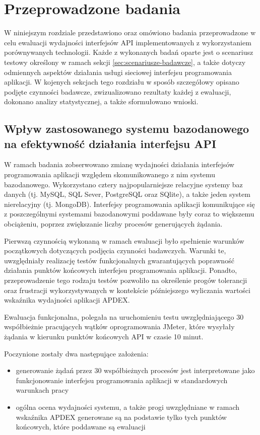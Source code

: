 \chapter{Przeprowadzone badania}
W niniejszym rozdziale przedstawiono oraz omówiono badania przeprowadzone w celu ewaluacji wydajności interfejsów API implementowanych z wykorzystaniem porównywanych technologii. Każde z wykonanych badań oparte jest o scenariusz testowy określony w ramach sekcji \ref{sec:scenariusze-badawcze}, a także dotyczy odmiennych aspektów działania usługi sieciowej interfejsu programowania aplikacji. W kojenych sekcjach tego rozdziału w sposób szczegółowy opisano podjęte czynności badawcze, zwizualizowano rezultaty każdej z ewaluacji, dokonano analizy statystycznej, a także sformułowano wnioski.

\section{Wpływ zastosowanego systemu bazodanowego na efektywność działania interfejsu API}
W ramach badania zobserwowano zmianę wydajności działania interfejsów programowania aplikacji względem skomunikowanego z nim systemu bazodanowego. Wykorzystano cztery najpopularniejsze relacyjne systemy baz danych (tj. MySQL, SQL Sever, PostgreSQL oraz SQlite), a także jeden system nierelacyjny (tj. MongoDB). Interfejsy programowania aplikacji komunikujące się z poszczególnymi systemami bazodanowymi poddawane były coraz to większemu obciążeniu, poprzez zwiększanie liczby procesów generujących żądania.

Pierwszą czynnością wykonaną w ramach ewaluacji było spełnienie warunków początkowych dotyczących podjęcia czynności badawczych. Warunki te, uwzględniały realizację testów funkcjonalnych gwarantujących poprawność działania punktów końcowych interfejsu programowania aplikacji. Ponadto, przeprowadzenie tego rodzaju testów pozwoliło na określenie progów tolerancji oraz frustracji wykorzystywanych w kontekście późniejszego wyliczania wartości wskaźnika wydajności aplikacji APDEX.

Ewaluacja funkcjonalna, polegała na uruchomieniu testu uwzględniającego 30 współbieżnie pracujących wątków oprogramowania JMeter, które wysyłały żądania w kierunku punktów końcowych API w czasie 10 minut.

Poczynione zostały dwa następujące założenia:
\begin{itemize}
    \item generowanie żądań przez 30 współbieżnych procesów jest interpretowane jako funkcjonowanie interfejsu programowania aplikacji w standardowych warunkach pracy
    \item ogólna ocena wydajności systemu, a także progi uwzględniane w ramach wskaźnika APDEX generowane są na podstawie tylko tych punktów końcowych, które poddawane są ewaluacji
\end{itemize}

